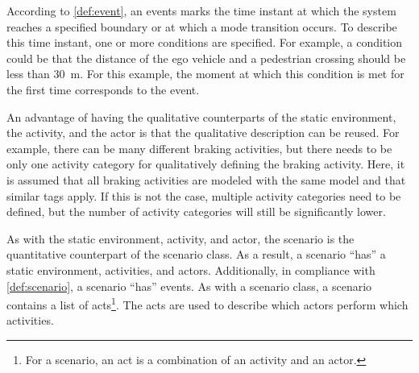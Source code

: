 According to \cref{def:event}, an events marks the time instant at which the system reaches a specified boundary or at which a mode transition occurs. To describe this time instant, one or more conditions are specified. For example, a condition could be that the distance of the ego vehicle and a pedestrian crossing should be less than \SI{30}{\meter}. For this example, the moment at which this condition is met for the first time corresponds to the event.

An advantage of having the qualitative counterparts of the static environment, the activity, and the actor is that the qualitative description can be reused. For example, there can be many different braking activities, but there needs to be only one activity category for qualitatively defining the braking activity. Here, it is assumed that all braking activities are modeled with the same model and that similar tags apply. If this is not the case, multiple activity categories need to be defined, but the number of activity categories will still be significantly lower.

As with the static environment, activity, and actor, the scenario is the quantitative counterpart of the scenario class. As a result, a scenario ``has'' a static environment, activities, and actors. Additionally, in compliance with \cref{def:scenario}, a scenario ``has'' events. As with a scenario class, a scenario contains a list of acts\cbstart\footnote{\cbstart For a scenario, an act is a combination of an activity and an actor.\cbend}. The acts are used to describe which actors perform which activities.\cbend
